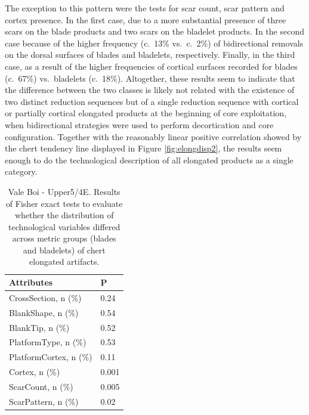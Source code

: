 \documentclass[12pt,twoside]{reedthesis}
\begin{document}
The exception to this pattern were the tests for scar count, scar pattern and cortex presence. In the first case, due to a more substantial presence of three scars on the blade products and two scars on the bladelet products. In the second case because of the higher frequency (c.~13\% vs.~c.~2\%) of bidirectional removals on the dorsal surfaces of blades and bladelets, respectively. Finally, in the third case, as a result of the higher frequencies of cortical surfaces recorded for blades (c.~67\%) vs.~bladelets (c.~18\%). Altogether, these results seem to indicate that the difference between the two classes is likely not related with the existence of two distinct reduction sequences but of a single reduction sequence with cortical or partially cortical elongated products at the beginning of core exploitation, when bidirectional strategies were used to perform decortication and core configuration. Together with the reasonably linear positive correlation showed by the chert tendency line displayed in Figure \ref{fig:elongdisp2}, the results seem enough to do the technological description of all elongated products as a single category.
\begin{table}[!h]

\caption{\label{tab:fisherelongVB2}Vale Boi - Upper5/4E. Results of Fisher exact tests to evaluate whether the distribution of technological variables differed across metric groups (blades and bladelets) of chert elongated artifacts.}
\centering
\fontsize{9}{11}\selectfont
\begin{tabular}[t]{ll}
\toprule
Attributes & P\\
\midrule
CrossSection, n (\%) & 0.24\\
BlankShape, n (\%) & 0.54\\
BlankTip, n (\%) & 0.52\\
PlatformType, n (\%) & 0.53\\
PlatformCortex, n (\%) & 0.11\\
\addlinespace
Cortex, n (\%) & 0.001\\
ScarCount, n (\%) & 0.005\\
ScarPattern, n (\%) & 0.02\\
\bottomrule
\end{tabular}
\end{table}
~
\end{document}
